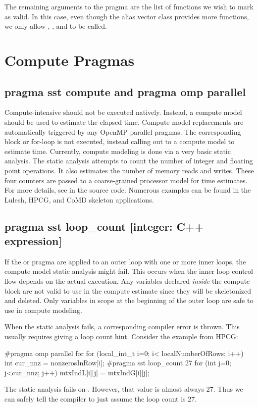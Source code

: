 The remaining arguments to the pragma are the list of functions we wish to mark as valid.
In this case, even though the alias vector class provides more functions, we only allow , , and  to be called.



\section{Compute Pragmas}
\subsection{pragma sst compute and pragma omp parallel}
Compute-intensive should not be executed natively.
Instead, a compute model should be used to estimate the elapsed time.
Compute model replacements are automatically triggered by any OpenMP parallel pragmas.
The corresponding block or for-loop is not executed, instead calling out to a compute model to estimate time.
Currently, compute modeling is done via a very basic static analysis.
The static analysis attempts to count the number of integer and floating point operations.
It also estimates the number of memory reads and writes.
These four counters are passed to a coarse-grained processor model for time estimates.
For more details, see  in the source code.
Numerous examples can be found in the Lulesh, HPCG, and CoMD skeleton applications.

\subsection{pragma sst loop\_count [integer: C++ expression]}
If the  or  pragma are applied to an outer loop with one or more inner loops,
the compute model static analysis might fail.
This occurs when the inner loop control flow depends on the actual execution.
Any variables declared \emph{inside} the compute block are not valid to use in the compute estimate since they will be skeletonized and deleted.
Only variables in scope at the beginning of the outer loop are safe to use in compute modeling.

When the static analysis fails, a corresponding compiler error is thrown.
This usually requires giving a loop count hint.
Consider the example from HPCG:

\begin{CppCode}
#pragma omp parallel for
  for (local_int_t i=0; i< localNumberOfRows; i++) {
    int cur_nnz = nonzerosInRow[i];
   #pragma sst loop_count 27
    for (int j=0; j<cur_nnz; j++) mtxIndL[i][j] = mtxIndG[i][j];
  }
\end{CppCode}
The static analysis fails on .
However, that value is almost always 27.
Thus we can safely tell the compiler to just assume the loop count is 27.

